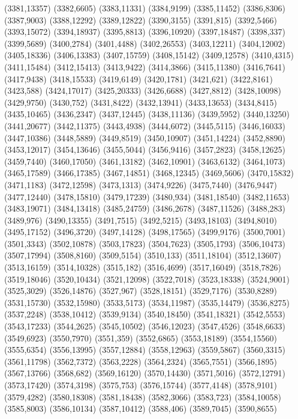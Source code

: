 (3381,13357)
(3382,6605)
(3383,11331)
(3384,9199)
(3385,11452)
(3386,8306)
(3387,9003)
(3388,12292)
(3389,12822)
(3390,3155)
(3391,815)
(3392,5466)
(3393,15072)
(3394,18937)
(3395,8813)
(3396,10920)
(3397,18487)
(3398,337)
(3399,5689)
(3400,2784)
(3401,4488)
(3402,26553)
(3403,12211)
(3404,12002)
(3405,18336)
(3406,13383)
(3407,15759)
(3408,15142)
(3409,12578)
(3410,4315)
(3411,15484)
(3412,15413)
(3413,9422)
(3414,3866)
(3415,11380)
(3416,7641)
(3417,9438)
(3418,15533)
(3419,6149)
(3420,1781)
(3421,621)
(3422,8161)
(3423,588)
(3424,17017)
(3425,20333)
(3426,6688)
(3427,8812)
(3428,10098)
(3429,9750)
(3430,752)
(3431,8422)
(3432,13941)
(3433,13653)
(3434,8415)
(3435,10465)
(3436,2347)
(3437,12445)
(3438,11136)
(3439,5952)
(3440,13250)
(3441,20677)
(3442,11375)
(3443,4938)
(3444,6072)
(3445,5115)
(3446,16033)
(3447,10386)
(3448,5889)
(3449,8519)
(3450,10907)
(3451,14224)
(3452,8890)
(3453,12017)
(3454,13646)
(3455,5044)
(3456,9416)
(3457,2823)
(3458,12625)
(3459,7440)
(3460,17050)
(3461,13182)
(3462,10901)
(3463,6132)
(3464,1073)
(3465,17589)
(3466,17385)
(3467,14851)
(3468,12345)
(3469,5606)
(3470,15832)
(3471,1183)
(3472,12598)
(3473,1313)
(3474,9226)
(3475,7440)
(3476,9447)
(3477,12440)
(3478,15810)
(3479,17239)
(3480,934)
(3481,18540)
(3482,11653)
(3483,19071)
(3484,13418)
(3485,24759)
(3486,2678)
(3487,11526)
(3488,283)
(3489,976)
(3490,13355)
(3491,7515)
(3492,5215)
(3493,18103)
(3494,8010)
(3495,17152)
(3496,3720)
(3497,14128)
(3498,17565)
(3499,9176)
(3500,7001)
(3501,3343)
(3502,10878)
(3503,17823)
(3504,7623)
(3505,1793)
(3506,10473)
(3507,17994)
(3508,8160)
(3509,5154)
(3510,133)
(3511,18104)
(3512,13607)
(3513,16159)
(3514,10328)
(3515,182)
(3516,4699)
(3517,16049)
(3518,7826)
(3519,18046)
(3520,10434)
(3521,12098)
(3522,7018)
(3523,18338)
(3524,9001)
(3525,3029)
(3526,14876)
(3527,967)
(3528,18151)
(3529,7176)
(3530,8289)
(3531,15730)
(3532,15980)
(3533,5173)
(3534,11987)
(3535,14479)
(3536,8275)
(3537,2248)
(3538,10412)
(3539,9134)
(3540,18450)
(3541,18321)
(3542,5553)
(3543,17233)
(3544,2625)
(3545,10502)
(3546,12023)
(3547,4526)
(3548,6633)
(3549,6923)
(3550,7970)
(3551,359)
(3552,6865)
(3553,18189)
(3554,15560)
(3555,6354)
(3556,13995)
(3557,12884)
(3558,12963)
(3559,5867)
(3560,3315)
(3561,11798)
(3562,7372)
(3563,2228)
(3564,2324)
(3565,7551)
(3566,1895)
(3567,13766)
(3568,682)
(3569,16120)
(3570,14430)
(3571,5016)
(3572,12791)
(3573,17420)
(3574,3198)
(3575,753)
(3576,15744)
(3577,4148)
(3578,9101)
(3579,4282)
(3580,18308)
(3581,18438)
(3582,3066)
(3583,723)
(3584,10058)
(3585,8003)
(3586,10134)
(3587,10412)
(3588,406)
(3589,7045)
(3590,8655)
